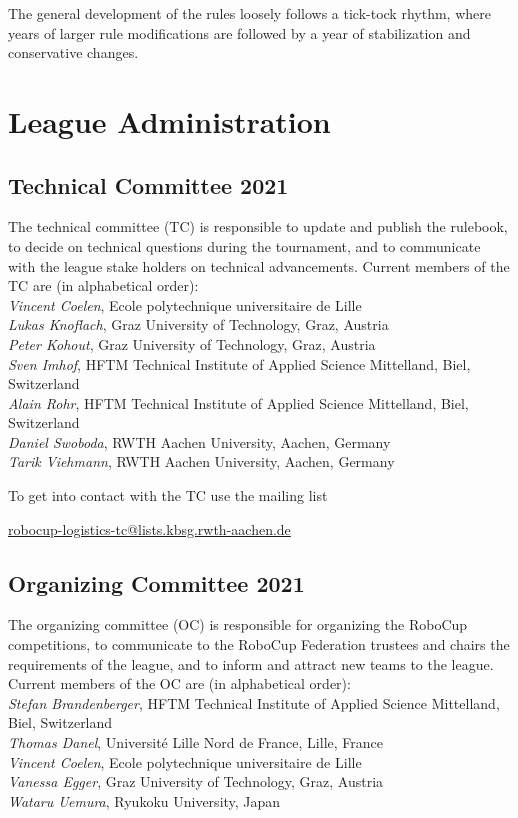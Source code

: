 \documentclass[12pt,twoside]{article}
\begin{document}
The general development of the rules loosely follows a tick-tock
rhythm, where years of larger rule modifications are followed by a
year of stabilization and conservative changes.


\section{League Administration} \label{sec:commitees}
\subsection{Technical Committee 2021}
\label{sec:tc}
The technical committee (TC) is responsible to update and publish the
rulebook, to decide on technical questions during the tournament, and
to communicate with the league stake holders on technical
advancements. Current members of the TC are (in alphabetical order):\\[.5em]
\emph{Vincent Coelen}, Ecole polytechnique universitaire de Lille\\
\emph{Lukas Knoflach}, Graz University of Technology, Graz, Austria\\
\emph{Peter Kohout}, Graz University of Technology, Graz, Austria\\
\emph{Sven Imhof}, HFTM Technical Institute of Applied Science Mittelland,
Biel, Switzerland\\
\emph{Alain Rohr}, HFTM Technical Institute of Applied Science Mittelland,
Biel, Switzerland\\
\emph{Daniel Swoboda}, RWTH Aachen University, Aachen, Germany\\
\emph{Tarik Viehmann}, RWTH Aachen University, Aachen, Germany

\medskip
\noindent To get into contact with the TC use the mailing list\\
\centerline{\url{robocup-logistics-tc@lists.kbsg.rwth-aachen.de}}

\subsection{Organizing Committee 2021}
\label{sec:oc}
The organizing committee (OC) is responsible for organizing the
RoboCup competitions, to communicate to the RoboCup Federation
trustees and chairs the requirements of the league, and to inform and
attract new teams to the league. Current members of the OC are (in
alphabetical order):\\[.5em]
\emph{Stefan Brandenberger}, HFTM Technical Institute of Applied Science
Mittelland, Biel, Switzerland\\
\emph{Thomas Danel}, Université Lille Nord de France, Lille, France\\
\emph{Vincent Coelen}, Ecole polytechnique universitaire de Lille\\
\emph{Vanessa Egger}, Graz University of Technology, Graz, Austria\\
\emph{Wataru Uemura}, Ryukoku University, Japan
\end{document}
